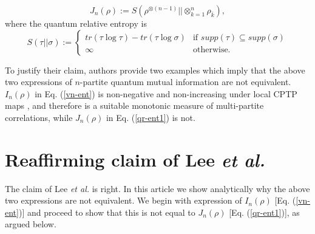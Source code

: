 \documentclass[aps,onecolumn,qic,superscriptaddress,11pt]{revtex4-1}
\begin{document}
\begin{equation}\label{qr-ent1}
J_n(\rho) := S(\rho^{\otimes (n-1)} || \otimes^n_{k=1} \rho_{\overline{k}}),
\end{equation}
where the quantum relative entropy is 
\[
 S(\tau || \sigma) := 
  \begin{cases} 
   tr (\tau \log \tau) - tr (\tau \log \sigma) & \text{if } supp(\tau) \subseteq supp(\sigma) \\
   \infty       & \text{otherwise.} 
  \end{cases}
\]

To justify their claim, authors provide two examples which imply that the above two expressions of $n$-partite quantum mutual information are not equivalent. 
$I_n(\rho)$  in Eq. (\ref{vn-ent}) is non-negative and non-increasing under local CPTP maps \cite{cerf}, and therefore is a suitable monotonic measure of multi-partite correlations, while $J_n(\rho)$ in Eq. (\ref{qr-ent1}) is not. 

\section{Reaffirming claim of Lee {\it et al.}}
The claim of Lee {\it et al.} is right. 
In this article we show analytically why the above two expressions are not equivalent. We begin with expression of $I_n(\rho)$ [Eq. (\ref{vn-ent})] and proceed to show that this is not equal to $J_n(\rho)$ [Eq. (\ref{qr-ent1})], as argued below.
\end{document}
